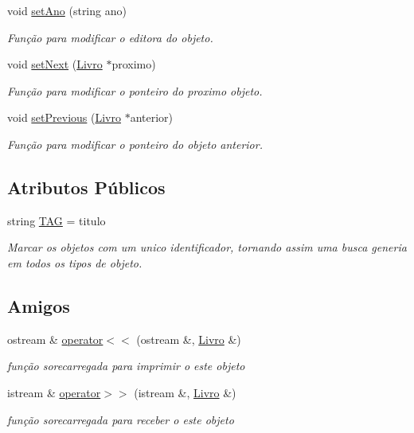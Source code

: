 \begin{DoxyCompactItemize}
void \hyperlink{class_livro_a7a5d33fab8e1035fe0b3a20ab398cf54}{set\+Ano} (string ano)
\begin{DoxyCompactList}\small\item\em Função para modificar o editora do objeto. \end{DoxyCompactList}\item 
void \hyperlink{class_livro_a404dde562015b86c989e7407b03f2d71}{set\+Next} (\hyperlink{class_livro}{Livro} $\ast$proximo)
\begin{DoxyCompactList}\small\item\em Função para modificar o ponteiro do proximo objeto. \end{DoxyCompactList}\item 
void \hyperlink{class_livro_a93e3b1c1f9adf1974dae564acd18b71b}{set\+Previous} (\hyperlink{class_livro}{Livro} $\ast$anterior)
\begin{DoxyCompactList}\small\item\em Função para modificar o ponteiro do objeto anterior. \end{DoxyCompactList}\end{DoxyCompactItemize}
\subsection*{Atributos Públicos}
\begin{DoxyCompactItemize}
\item 
string \hyperlink{class_livro_aaa48373327454aabb96ba8d7f5835963}{T\+AG} = titulo
\begin{DoxyCompactList}\small\item\em Marcar os objetos com um unico identificador, tornando assim uma busca generia em todos os tipos de objeto. \end{DoxyCompactList}\end{DoxyCompactItemize}
\subsection*{Amigos}
\begin{DoxyCompactItemize}
\item 
ostream \& \hyperlink{class_livro_a7fe67fc2cf13c93b17992ecb006cdb80}{operator$<$$<$} (ostream \&, \hyperlink{class_livro}{Livro} \&)
\begin{DoxyCompactList}\small\item\em função sorecarregada para imprimir o este objeto \end{DoxyCompactList}\item 
istream \& \hyperlink{class_livro_ad5bddb8ab23283c6b4a82ffedd1988f4}{operator$>$$>$} (istream \&, \hyperlink{class_livro}{Livro} \&)
\begin{DoxyCompactList}\small\item\em função sorecarregada para receber o este objeto \end{DoxyCompactList}\end{DoxyCompactItemize}


